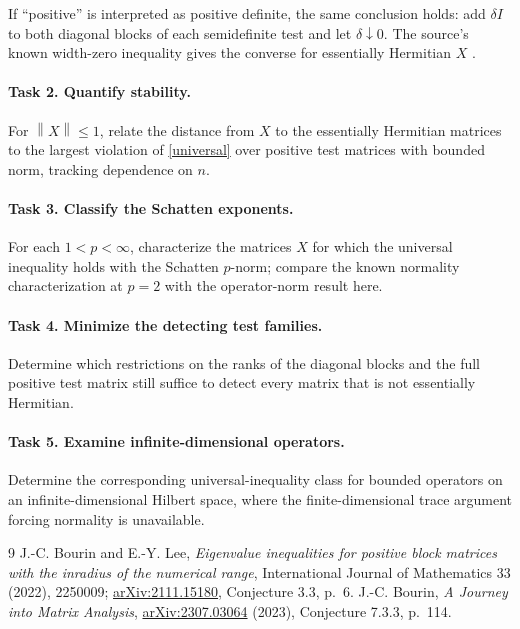 \documentclass[11pt]{article}
\newcommand{\norm}[1]{\left\lVert#1\right\rVert}
\begin{document}
If ``positive'' is interpreted as positive definite, the same conclusion
holds: add $\delta I$ to both diagonal blocks of each semidefinite test
and let $\delta\downarrow0$. The source's known width-zero inequality
gives the converse for essentially Hermitian $X$ \cite{BL,B}.

\paragraph{Task 2. Quantify stability.}
For $\norm X\leq1$, relate the distance from $X$ to the essentially
Hermitian matrices to the largest violation of \eqref{universal} over
positive test matrices with bounded norm, tracking dependence on $n$.

\paragraph{Task 3. Classify the Schatten exponents.}
For each $1<p<\infty$, characterize the matrices $X$ for which the
universal inequality holds with the Schatten $p$-norm; compare the known
normality characterization at $p=2$ with the operator-norm result here.

\paragraph{Task 4. Minimize the detecting test families.}
Determine which restrictions on the ranks of the diagonal blocks and
the full positive test matrix still suffice to detect every matrix that
is not essentially Hermitian.

\paragraph{Task 5. Examine infinite-dimensional operators.}
Determine the corresponding universal-inequality class for bounded
operators on an infinite-dimensional Hilbert space, where the
finite-dimensional trace argument forcing normality is unavailable.

\begin{thebibliography}{9}
 J.-C. Bourin and E.-Y. Lee,
\emph{Eigenvalue inequalities for positive block matrices with the
inradius of the numerical range}, International Journal of Mathematics
33 (2022), 2250009; \href{https://arxiv.org/abs/2111.15180}{arXiv:2111.15180},
Conjecture 3.3, p.~6.
 J.-C. Bourin, \emph{A Journey into Matrix Analysis},
\href{https://arxiv.org/abs/2307.03064}{arXiv:2307.03064} (2023),
Conjecture 7.3.3, p.~114.
\end{thebibliography}
\end{document}
